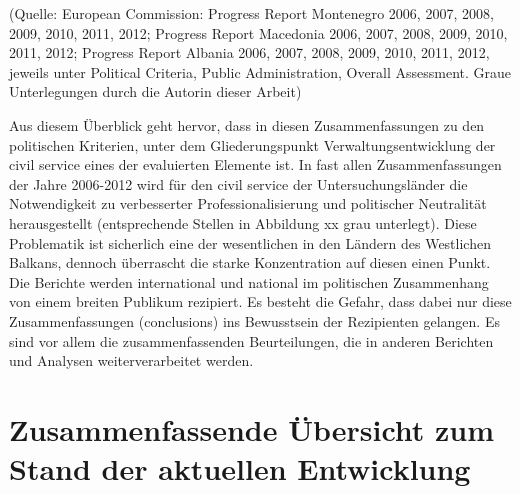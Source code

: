 (Quelle: European Commission: Progress Report Montenegro 2006, 2007, 2008, 2009, 2010, 2011, 2012; Progress Report Macedonia 2006, 2007, 2008, 2009, 2010, 2011, 2012; Progress Report Albania 2006, 2007, 2008, 2009, 2010, 2011, 2012, jeweils unter Political Criteria, Public Administration, Overall Assessment. Graue Unterlegungen durch die Autorin dieser Arbeit)\par
Aus diesem Überblick geht hervor, dass in diesen Zusammenfassungen zu den politischen Kriterien, unter dem Gliederungspunkt Verwaltungsentwicklung der civil service eines der evaluierten Elemente ist. In fast allen Zusammenfassungen der Jahre 2006-2012 wird für den civil service der Untersuchungsländer die Notwendigkeit zu verbesserter Professionalisierung und politischer Neutralität herausgestellt (entsprechende Stellen in Abbildung xx grau unterlegt). Diese Problematik ist sicherlich eine der wesentlichen in den Ländern des Westlichen Balkans, dennoch überrascht die starke Konzentration auf diesen einen Punkt. Die Berichte werden international und national im politischen Zusammenhang von einem breiten Publikum rezipiert. Es besteht die Gefahr, dass dabei nur diese Zusammenfassungen (conclusions) ins Bewusstsein der Rezipienten gelangen. Es sind vor allem die zusammenfassenden Beurteilungen, die in anderen Berichten und Analysen weiterverarbeitet werden.

\section{Zusammenfassende Übersicht zum Stand der aktuellen Entwicklung }

